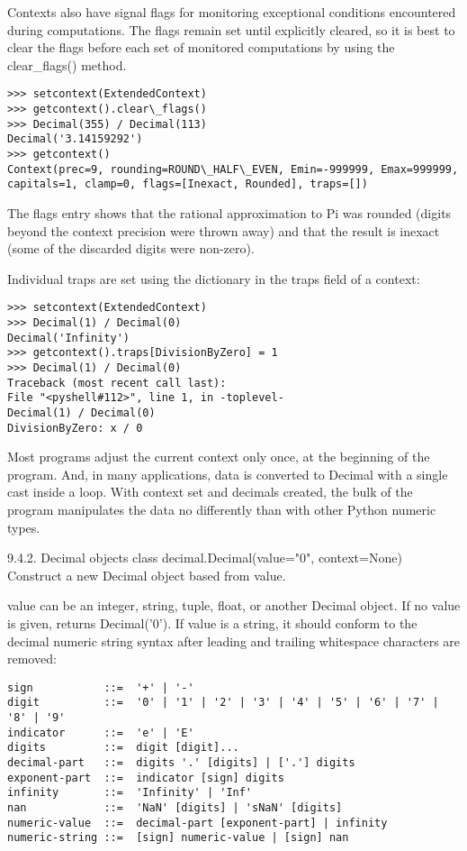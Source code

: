 Contexts also have signal flags for monitoring exceptional conditions encountered during computations. The flags remain set until explicitly cleared, so it is best to clear the flags before each set of monitored computations by using the clear\_flags() method.

\begin{lstlisting}
>>> setcontext(ExtendedContext)
>>> getcontext().clear\_flags()
>>> Decimal(355) / Decimal(113)
Decimal('3.14159292')
>>> getcontext()
Context(prec=9, rounding=ROUND\_HALF\_EVEN, Emin=-999999, Emax=999999,
capitals=1, clamp=0, flags=[Inexact, Rounded], traps=[])
\end{lstlisting}

The flags entry shows that the rational approximation to Pi was rounded (digits beyond the context precision were thrown away) and that the result is inexact (some of the discarded digits were non-zero).

Individual traps are set using the dictionary in the traps field of a context:

\begin{lstlisting}
>>> setcontext(ExtendedContext)
>>> Decimal(1) / Decimal(0)
Decimal('Infinity')
>>> getcontext().traps[DivisionByZero] = 1
>>> Decimal(1) / Decimal(0)
Traceback (most recent call last):
File "<pyshell#112>", line 1, in -toplevel-
Decimal(1) / Decimal(0)
DivisionByZero: x / 0
\end{lstlisting}

Most programs adjust the current context only once, at the beginning of the program. And, in many applications, data is converted to Decimal with a single cast inside a loop. With context set and decimals created, the bulk of the program manipulates the data no differently than with other Python numeric types.


9.4.2. Decimal objects
class decimal.Decimal(value="0", context=None)
Construct a new Decimal object based from value.

value can be an integer, string, tuple, float, or another Decimal object. If no value is given, returns Decimal('0'). If value is a string, it should conform to the decimal numeric string syntax after leading and trailing whitespace characters are removed:

\begin{lstlisting}
sign           ::=  '+' | '-'
digit          ::=  '0' | '1' | '2' | '3' | '4' | '5' | '6' | '7' | '8' | '9'
indicator      ::=  'e' | 'E'
digits         ::=  digit [digit]...
decimal-part   ::=  digits '.' [digits] | ['.'] digits
exponent-part  ::=  indicator [sign] digits
infinity       ::=  'Infinity' | 'Inf'
nan            ::=  'NaN' [digits] | 'sNaN' [digits]
numeric-value  ::=  decimal-part [exponent-part] | infinity
numeric-string ::=  [sign] numeric-value | [sign] nan
\end{lstlisting}

